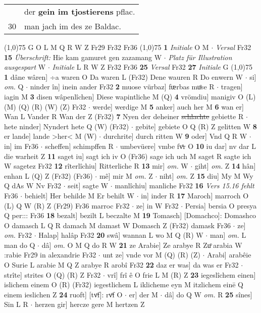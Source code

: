\documentclass[8pt,a4paper,notitlepage]{article}
\begin{document}
\begin{table}[ht]
\begin{minipage}[t]{0.5\linewidth}
\begin{tabular}{rl}
 & der \textbf{gein im tjostierens} pflac.\\ 
30 & man jach im des ze Baldac.\\ 
\end{tabular}
\scriptsize
\line(1,0){75} \newline
G O L M Q R W Z Fr29 Fr32 Fr36 \newline
\line(1,0){75} \newline
\textbf{1} \textit{Initiale} O M   $\cdot$ \textit{Versal} Fr32  \textbf{15} \textit{Überschrift:} Hie kam gamuret gen zazamang W   $\cdot$ \textit{Platz für Illustration ausgespart} W   $\cdot$ \textit{Initiale} L R W Z Fr32 Fr36  \textbf{25} \textit{Versal} Fr32  \textbf{27} \textit{Initiale} G  \newline
\line(1,0){75} \newline
\textbf{1} dâne wâren] ÷a waren O Da waren L (Fr32) Dene wauren R Do enwern W  $\cdot$ si] \textit{om.} Q  $\cdot$ ninder în] inein ander Fr32 \textbf{2} muose vürbaz] fᵫrbas muͦse R  $\cdot$ tragen] iagin M \textbf{3} disen wâpenlîchen] Diese wapintliche M (Q) \textbf{4} vrömdiu] manigiv O (L) (M) (Q) (R) (W) (Z) Fr32  $\cdot$ werde] werdige M \textbf{5} anker] auch her M \textbf{6} wan er] Wan L Vander R Wan der Z (Fr32) \textbf{7} Nyen der deheiner \sout{schlachte} gebiette R  $\cdot$ hete ninder] Nyndert hete Q (W) (Fr32)  $\cdot$ gebite] gebiete O Q (R) Z gelitten W \textbf{8} er lande] lande >her< M (W)  $\cdot$ durchrite] durch ritten W \textbf{9} oder] Vnd Q R W  $\cdot$ in] im Fr36  $\cdot$ scheffen] schimpffen R  $\cdot$ umbevüere] vmbe fvͦr O \textbf{10} iu dar] nv dar L die warheit Z \textbf{11} saget iu] sagt ich iv O (Fr36) sage ich uch M saget R sagte ich W sagetez Fr32 \textbf{12} rîterlîchiu] Ritterliche R \textbf{13} mir] \textit{om.} W  $\cdot$ giht] \textit{om.} Z \textbf{14} hân] enhan L (Q) Z (Fr32) (Fr36)  $\cdot$ mê] mir M \textit{om.} Z  $\cdot$ niht] \textit{om.} Z \textbf{15} diu] My M Wy Q dAs W Nv Fr32  $\cdot$ seit] sagte W  $\cdot$ manlîchiu] manliche Fr32 \textbf{16} \textit{Vers 15.16 fehlt} Fr36   $\cdot$ behielt] Her behilde M Er behilt W  $\cdot$ in] inder R \textbf{17} Maroch] marroch O (L) Q W (R) Z (Fr29) Fr36 marroc Fr32  $\cdot$ ze] in W Fr32  $\cdot$ Persia] bersia O presya Q per::: Fr36 \textbf{18} bezalt] bezilt L beczalte M \textbf{19} Tomasch] [Domachco]: Domashco O damasch L Q R damach M damast W Domasch Z (Fr32) damask Fr36  $\cdot$ ze] \textit{om.} Fr32  $\cdot$ Halap] halâp Fr32 \textbf{20} swâ] wannan L wo M Q (R) W  $\cdot$ man] \textit{om.} L man do Q  $\cdot$ dâ] \textit{om.} O M Q do R W \textbf{21} ze Arabie] Ze arabye R Zuͦ arabia W :rabie Fr29 in alexandrie Fr32  $\cdot$ unt ze] vnde vor M (Q) (R) (Z)  $\cdot$ Arabi] arabêie O Surie L arabie M Q Z arabye R arobî Fr32 \textbf{22} daz er was] da was er Fr32  $\cdot$ strîte] strites O (Q) (R) Z Fr32  $\cdot$ vrî] frî ê O frie L M (R) Z \textbf{23} iegeslîchem einen] islichem einem O (R) (Fr32) iegestlichem L iklicheme eyn M itzlichem einē Q einem ieslichen Z \textbf{24} ruoft] [tvͦf]: rvͦf O  $\cdot$ er] der M  $\cdot$ dâ] do Q W \textit{om.} R \textbf{25} sînes] Sin L R  $\cdot$ herzen gir] hercze gere M hertzen Z 
\end{minipage}
\end{table}
\end{document}
